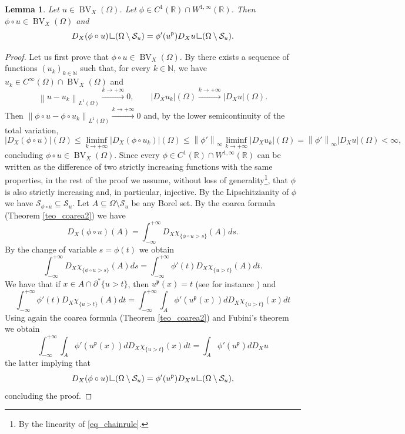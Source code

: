 \documentclass[12pt,a4paper]{amsart}
\theoremstyle{definition}
\theoremstyle{plain}
\newtheorem{lem}[defi]{Lemma}
\newcommand{\N}{\mathbb{N}}
\newcommand{\R}{\mathbb{R}}
\newcommand{\pp}{\partial}
\newcommand{\se}{\subseteq}
\newcommand{\res} {\mathop{\hbox{\vrule height 7pt width .5pt depth 0pt \vrule height .5pt width 6pt depth 0pt}}\nolimits}
\newcommand{\bv}{\operatorname{BV}}
\newcommand{\nl}{\left\|}
\newcommand{\nr}{\right\|}
\newcommand{\s}{\mathcal{S}}
\newcommand{\p}{{\mathfrak{p}}}
\begin{document}
\begin{lem}\label{lemma_chain}
    Let $u \in \bv_X(\Omega)$. Let $\phi \in C^1(\R) \cap W^{1,\infty}(\R)$. Then $ \phi \circ u\in \bv_X(\Omega)$ and
    \begin{equation}\label{eq_chainrule}
    D_X(\phi \circ u) \res (\Omega \setminus \s_u) =\phi'(u^\p) D_Xu \res (\Omega \setminus \s_u).
    \end{equation}
\end{lem}
\begin{proof}
    Let us first prove that $\phi \circ u \in \bv_X(\Omega)$. By \cite[Theorem 2.2.2]{fssc} there exists a sequence of functions $(u_k)_{k \in \N}$ such that, for every $k \in \N$, we have $u_k \in C^\infty(\Omega) \cap \bv_X(\Omega)$ and
    \[
    \nl u-u_k \nr_{L^1(\Omega)} \xrightarrow{k \to +\infty}0, \qquad |D_Xu_k|(\Omega) \xrightarrow{k \to +\infty}|D_Xu|(\Omega).
    \]
    Then $\nl \phi \circ u-\phi \circ u_k \nr_{L^1(\Omega)} \xrightarrow{k \to +\infty}0$ and, by the lower semicontinuity of the total variation, 
    \[
    |D_X(\phi \circ u)|(\Omega) \leq \liminf_{k \to +\infty} |D_X(\phi \circ u_k)|(\Omega) \leq \nl \phi' \nr_{\infty}\liminf_{k \to +\infty}|D_Xu_k|(\Omega)=\nl \phi' \nr_{\infty}|D_Xu|(\Omega)<\infty,
    \]
concluding $\phi \circ u \in \bv_X(\Omega)$. Since every $\phi \in C^1(\R) \cap W^{1,\infty}(\R)$ can be written as the difference of two strictly increasing functions with the same properties, in the rest of the proof we assume, without loss of generality\footnote{By the linearity of \eqref{eq_chainrule}.}, that $\phi$ is also strictly increasing and, in particular, injective. By the Lipschitzianity of $\phi$ we have $\s_{\phi \circ u} \se \s_u$. Let $A \se \Omega \setminus \s_u$ be any Borel set. By the coarea formula (Theorem \ref{teo_coarea2}) we have
\[
D_X(\phi \circ u)(A)=\int_{-\infty}^{+\infty} D_X\chi_{  \{ \phi \circ u >s  \}  } (A)ds.
\]
By the change of variable $s=\phi(t)$ we obtain
\[
\int_{-\infty}^{+\infty} D_X\chi_{\{\phi \circ u>s \}} (A)ds=\int_{-\infty}^{+\infty} \phi'(t)D_X\chi_{\{u>t \}} (A)dt.
\]
We have that if $x \in A \cap \pp^* \{u>t \} $, then $u^\p(x)=t$ (see for instance \cite[Proposition 2.22]{dv}) and 
\[
\int_{-\infty}^{+\infty} \phi'(t)D_X\chi_{\{u>t \}} (A)dt=\int_{-\infty}^{+\infty}\int_A\phi'(u^\p(x))dD_X\chi_{\{u>t \}}(x)dt
\]
Using again the coarea formula (Theorem \ref{teo_coarea2}) and Fubini's theorem we obtain
\[
\int_{-\infty}^{+\infty}\int_A\phi'(u^\p(x))dD_X\chi_{\{u>t \}}(x)dt=\int_A \phi'(u^\p)dD_Xu
\]
the latter implying that 
\[
D_X(\phi \circ u) \res (\Omega \setminus \s_u)=\phi'(u^\p)D_Xu\res (\Omega \setminus \s_u),   
\]
concluding the proof.

\end{proof}
\end{document}
